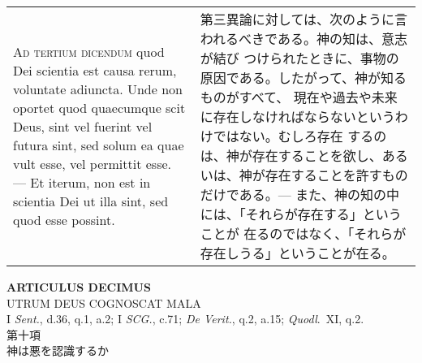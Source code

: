 \documentclass[10pt]{jsarticle} %
\begin{document}
\begin{longtable}{p{21em}p{21em}}
\\



{\scshape Ad tertium dicendum} quod Dei scientia est causa rerum,
voluntate adiuncta. Unde non oportet quod quaecumque scit Deus, sint
vel fuerint vel futura sint, sed solum ea quae vult esse, vel
permittit esse. --- Et iterum, non est in scientia Dei ut illa sint,
sed quod esse possint.


&


第三異論に対しては、次のように言われるべきである。神の知は、意志が結び
つけられたときに、事物の原因である。したがって、神が知るものがすべて、
現在や過去や未来に存在しなければならないというわけではない。むしろ存在
するのは、神が存在することを欲し、あるいは、神が存在することを許すもの
だけである。--- また、神の知の中には、「それらが存在する」ということが
在るのではなく、「それらが存在しうる」ということが在る。

\end{longtable}
\newpage


\begin{center}
{\Large {\bf ARTICULUS DECIMUS}}\\ {\large UTRUM DEUS COGNOSCAT
MALA}\\ {\footnotesize I {\itshape Sent.}, d.36, q.1, a.2; I
{\itshape SCG.}, c.71; {\itshape De Verit.}, q.2, a.15; {\itshape
Quodl}.~XI, q.2.}\\ {\Large 第十項\\神は悪を認識するか}
\end{center}
\end{document}
